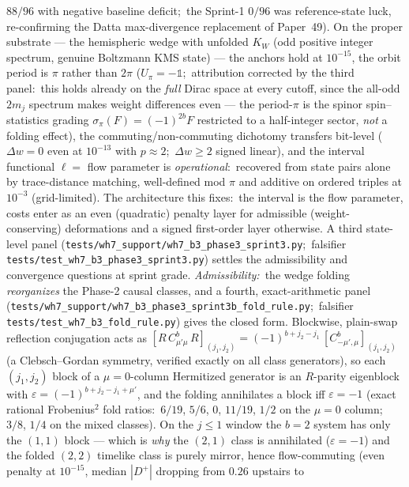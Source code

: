 \documentclass[11pt,a4paper]{article}
\theoremstyle{plain}
\theoremstyle{definition}
\begin{document}
\begin{enumerate}
$88/96$ with negative baseline deficit;\ the Sprint-1 $0/96$ was
reference-state luck, re-confirming the Datta max-divergence
replacement of Paper~49). On the proper substrate — the hemispheric
wedge with unfolded $K_{W}$ (odd positive integer spectrum, genuine
Boltzmann KMS state) — the anchors hold at $10^{-15}$, the orbit
period is $\pi$ rather than $2\pi$ ($U_{\pi} = -\mathbb{1}$;\
attribution corrected by the third panel:\ this holds already on the
\emph{full} Dirac space at every cutoff, since the all-odd $2m_{j}$
spectrum makes weight differences even — the period-$\pi$ is the
spinor spin–statistics grading $\sigma_{\pi}(F) = (-1)^{2b}F$
restricted to a half-integer sector, \emph{not} a folding effect), the
commuting/non-commuting dichotomy transfers bit-level
($\Delta w = 0$ even at $10^{-13}$ with $p \approx 2$;\
$\Delta w \ge 2$ signed linear), and the interval functional
$\ell = $ flow parameter is \emph{operational}:\ recovered from state
pairs alone by trace-distance matching, well-defined mod $\pi$ and
additive on ordered triples at $10^{-3}$ (grid-limited). The
architecture this fixes:\ the interval is the flow parameter, costs
enter as an even (quadratic) penalty layer for admissible
(weight-conserving) deformations and a signed first-order layer
otherwise. A third state-level panel
(\texttt{tests/wh7\_support/wh7\_b3\_phase3\_sprint3.py};\ falsifier
\texttt{tests/test\_wh7\_b3\_phase3\_sprint3.py}) settles the
admissibility and convergence questions at sprint grade.
\emph{Admissibility:}\ the wedge folding \emph{reorganizes} the
Phase-2 causal classes, and a fourth, exact-arithmetic panel
(\texttt{tests/wh7\_support/wh7\_b3\_phase3\_sprint3b\_fold\_rule.py};\ falsifier
\texttt{tests/test\_wh7\_b3\_fold\_rule.py}) gives the closed form.
Blockwise, plain-swap reflection conjugation acts as
$[R\,C^{b}_{\mu'\mu}\,R]_{(j_{1},j_{2})} =
(-1)^{b+j_{2}-j_{1}}\,[C^{b}_{-\mu',\mu}]_{(j_{1},j_{2})}$ (a
Clebsch--Gordan symmetry, verified exactly on all class generators),
so each $(j_{1},j_{2})$ block of a $\mu = 0$-column Hermitized
generator is an $R$-parity eigenblock with $\varepsilon =
(-1)^{b+j_{2}-j_{1}+\mu'}$, and the folding annihilates a block iff
$\varepsilon = -1$ (exact rational Frobenius$^{2}$ fold ratios:\
$6/19$, $5/6$, $0$, $11/19$, $1/2$ on the $\mu = 0$ column;\ $3/8$,
$1/4$ on the mixed classes). On the $j \le 1$ window the $b = 2$
system has only the $(1,1)$ block — which is \emph{why} the $(2,1)$
class is annihilated ($\varepsilon = -1$) and the folded $(2,2)$
timelike class is purely mirror, hence flow-commuting (even penalty
at $10^{-15}$, median $|D^{+}|$ dropping from $0.26$ upstairs to

\end{enumerate}
\end{document}
